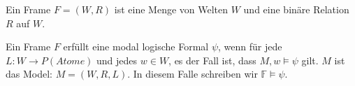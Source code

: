 \begin{definition}
	\label{def:frame}
	Ein Frame $F = (W,R)$ ist eine Menge von Welten $W$ und eine binäre Relation $R$ auf $W$.
\end{definition}
\cite[S.322]{huth2004logic}


\begin{definition}
	\label{def:frame_erfuellt}
	Ein Frame $F$ erfüllt eine modal logische Formal $\psi$, wenn für jede  $L: W \rightarrow P(Atome)$ und jedes $w \in W$, es der Fall ist, dass $M,w \vDash \psi$ gilt. $M$ ist das Model: $M = (W,R,L)$.
	In diesem Falle schreiben wir $\mathds{F} \vDash \psi$.
	\cite[S.322f]{huth2004logic}
\end{definition}






